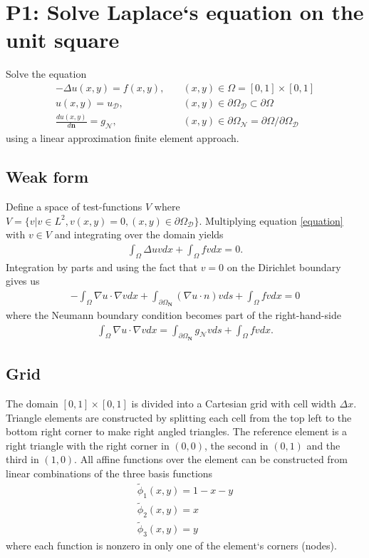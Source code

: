 \documentclass[12pt,a4paper]{report}
\begin{document}
	
\section*{P1: Solve Laplace`s equation on the unit square}

Solve the equation
\begin{align}
\label{equation}
- \Delta u(x, y) = f(x, y),& \quad (x, y) \in \Omega = [0, 1] \times [0, 1] \\
\label{dirch}
u(x, y) = u_\mathcal{D},& \quad (x, y) \in \partial\Omega_{\mathcal{D}} \subset \partial\Omega\\
\label{neum}
\frac{d u(x, y)}{d\mathbf{n}} = g_\mathcal{N},& \quad (x, y) \in \partial\Omega_{\mathcal{N}} = \partial\Omega / \partial \Omega_\mathcal{D}
\end{align}
using a linear approximation finite element approach.

\subsection*{Weak form}
Define a space of test-functions $V$ where $V = \{v | v\in L^2, v(x, y)=0, (x, y) \in \partial \Omega_\mathcal{D}\}$. Multiplying equation \eqref{equation} with $v \in V$ and integrating over the domain yields
\begin{align}
    \int_{\Omega} \Delta u v dx + \int_\Omega f v dx = 0.
\end{align}
Integration by parts and using the fact that $v = 0$ on the Dirichlet boundary gives us
\begin{align}
- \int_{\Omega} \nabla u \cdot \nabla v dx + \int_{\partial\Omega_\mathbf{N}} (\nabla u \cdot n) v ds + \int_\Omega f v dx = 0
\end{align}
where the Neumann boundary condition becomes part of the right-hand-side
\begin{align}
\label{weakform}
\int_{\Omega} \nabla u \cdot \nabla v dx = \int_{\partial\Omega_\mathbf{N}} g_\mathcal{N} v ds + \int_\Omega f v dx.
\end{align}

\subsection*{Grid}

The domain $[0, 1] \times [0, 1]$ is divided into a Cartesian grid with cell width $\Delta x$. Triangle elements are constructed by splitting each cell from the top left to the bottom right corner to make right angled triangles. The reference element is a right triangle with the right corner in $(0, 0)$, the second in $(0, 1)$ and the third in $(1, 0)$. All affine functions over the element can be constructed from linear combinations of the three basis functions
\begin{align}
    \tilde{\phi}_1(x, y) = 1 - x - y \\
    \tilde{\phi}_2(x, y) = x \\
    \tilde{\phi}_3(x, y) = y
\end{align}
where each function is nonzero in only one of the element`s corners (nodes). \\
\end{document}
